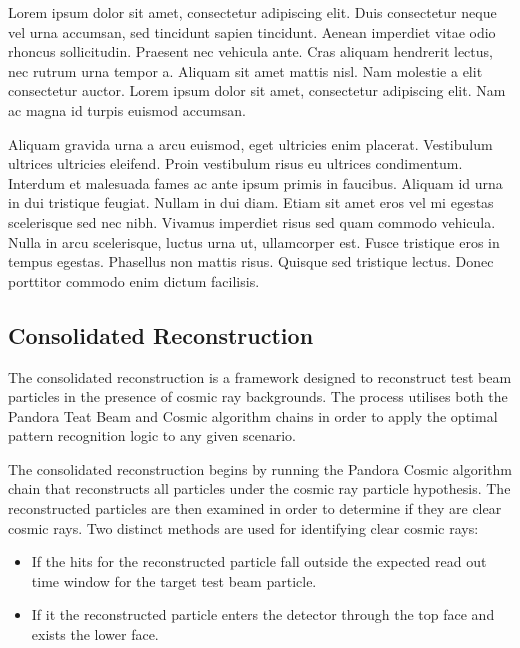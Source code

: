 Lorem ipsum dolor sit amet, consectetur adipiscing elit. Duis consectetur neque vel urna accumsan, sed tincidunt sapien tincidunt. Aenean imperdiet vitae odio rhoncus sollicitudin. Praesent nec vehicula ante. Cras aliquam hendrerit lectus, nec rutrum urna tempor a. Aliquam sit amet mattis nisl. Nam molestie a elit consectetur auctor. Lorem ipsum dolor sit amet, consectetur adipiscing elit. Nam ac magna id turpis euismod accumsan.

Aliquam gravida urna a arcu euismod, eget ultricies enim placerat. Vestibulum ultrices ultricies eleifend. Proin vestibulum risus eu ultrices condimentum. Interdum et malesuada fames ac ante ipsum primis in faucibus. Aliquam id urna in dui tristique feugiat. Nullam in dui diam. Etiam sit amet eros vel mi egestas scelerisque sed nec nibh. Vivamus imperdiet risus sed quam commodo vehicula. Nulla in arcu scelerisque, luctus urna ut, ullamcorper est. Fusce tristique eros in tempus egestas. Phasellus non mattis risus. Quisque sed tristique lectus. Donec porttitor commodo enim dictum facilisis.



\subsection{Consolidated Reconstruction}

The consolidated reconstruction is a framework designed to reconstruct test beam particles in the presence of cosmic ray backgrounds.  The process utilises both the Pandora Teat Beam and Cosmic algorithm chains in order to apply the optimal pattern recognition logic to any given scenario.   

The consolidated reconstruction begins by running the Pandora Cosmic algorithm chain that reconstructs all particles under the cosmic ray particle hypothesis.  The reconstructed particles are then examined in order to determine if they are clear cosmic rays.  Two distinct methods are used for identifying clear cosmic rays:

\begin{itemize}
\item If the hits for the reconstructed particle fall outside the expected read out time window for the target test beam particle.
\item If it the reconstructed particle enters the detector through the top face and exists the lower face.  
\end{itemize}

